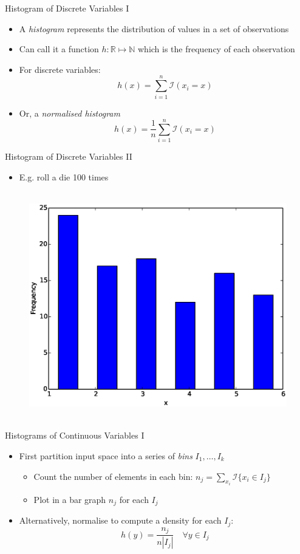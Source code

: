 \documentclass{beamer}
\begin{document}
\begin{frame}{Histogram of Discrete Variables I} 
\begin{itemize} 
 \item A \emph{histogram} represents the distribution of values in a set of observations
\item Can call it a function $h: \mathbb{R} \mapsto \mathbb{N}$ which is the frequency of each observation 
\item For discrete variables:
\begin{displaymath} 
 h(x) = \sum_{i=1}^n \mathcal{I}(x_i = x)
\end{displaymath}
\item Or, a \emph{normalised histogram}
\begin{displaymath} 
  h(x) = \frac{1}{n}\sum_{i=1}^n \mathcal{I}(x_i = x)
\end{displaymath}
\end{itemize}
\end{frame}

\begin{frame}{Histogram of Discrete Variables II}
\begin{itemize}
 \item E.g. roll a die 100 times 
\end{itemize}
\begin{figure}[htp]
\mbox{
\includegraphics[width=0.5\linewidth]{DiscreteHist.eps}
}
\end{figure}
\end{frame}

\begin{frame}{Histograms of Continuous Variables I}  
 \begin{itemize} 
  \item First partition input space into a series of \emph{bins} $ I_1, \ldots, I_k$ 
  \begin{itemize} 
  \item Count the number of elements in each bin: $n_j = \sum_{x_i} \mathcal{I}\{x_i \in I_j\}$
  \item Plot in a bar graph $n_j$ for each $I_j$
  \end{itemize} 
  \item Alternatively, normalise to compute a density for each $I_j$: 
  \begin{displaymath} 
    h(y) = \frac{n_j}{n |I_j|} \quad \forall y \in I_j
  \end{displaymath}
 \end{itemize}
\end{frame}
\end{document}
